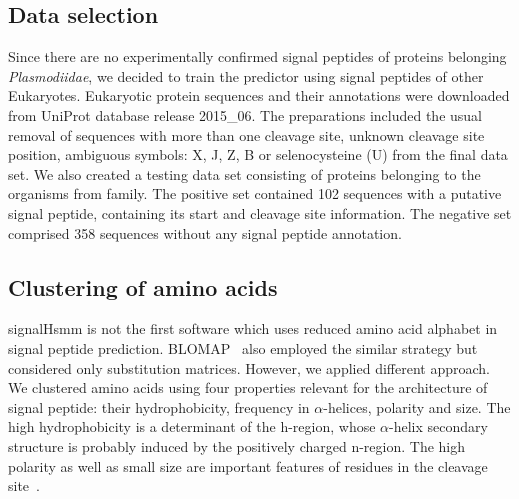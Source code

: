 \documentclass[10pt,letterpaper]{article}
\begin{document}
\subsection*{Data selection}

Since there are no experimentally confirmed signal peptides of proteins belonging \textit{Plasmodiidae}, we decided to train the predictor using signal peptides of other Eukaryotes. Eukaryotic protein sequences and their annotations were downloaded from UniProt database release 2015\_06. The preparations included the usual removal of sequences with more than one cleavage site, unknown cleavage site position, ambiguous symbols: X, J, Z, B or selenocysteine (U) from the final data set. We also created a testing data set consisting of proteins belonging to the organisms from  family. The positive set contained 102 sequences with a putative signal peptide, containing its start and cleavage site information. The negative set comprised 358 sequences without any signal peptide annotation.

\subsection*{Clustering of amino acids}

signalHsmm is not the first software which uses reduced amino acid alphabet in signal peptide prediction. BLOMAP~\cite{maetschke2005blomap} also employed the similar strategy but considered only substitution matrices. However, we applied different approach. We clustered amino acids using four properties relevant for the architecture of signal peptide: their hydrophobicity, frequency in $\alpha$-helices, polarity and size. The high hydrophobicity is a determinant of the h-region, whose $\alpha$-helix secondary structure is probably induced by the positively charged n-region. The high polarity as well as small size are important features of residues in the cleavage site~\cite{1994palzkillselection}.
\end{document}
